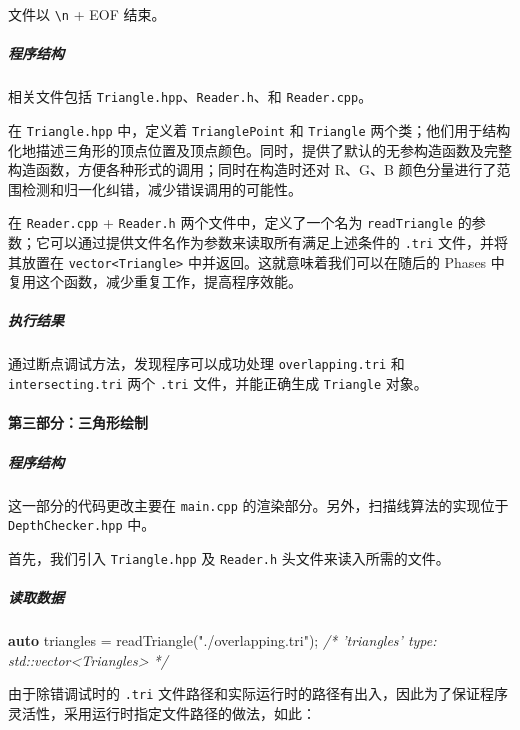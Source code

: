\documentclass[
]{article}
\newenvironment{Shaded}{}{}
\newcommand{\CommentTok}[1]{\textcolor[rgb]{0.38,0.63,0.69}{\textit{#1}}}
\newcommand{\KeywordTok}[1]{\textcolor[rgb]{0.00,0.44,0.13}{\textbf{#1}}}
\newcommand{\NormalTok}[1]{#1}
\newcommand{\StringTok}[1]{\textcolor[rgb]{0.25,0.44,0.63}{#1}}
\begin{document}
文件以 \texttt{\textquotesingle{}\textbackslash{}n\textquotesingle{}} +
EOF 结束。

\hypertarget{header-n28}{%
\subparagraph{程序结构}\label{header-n28}}

相关文件包括 \texttt{Triangle.hpp}、\texttt{Reader.h}、和
\texttt{Reader.cpp}。

在 \texttt{Triangle.hpp} 中，定义着 \texttt{TrianglePoint} 和
\texttt{Triangle}
两个类；他们用于结构化地描述三角形的顶点位置及顶点颜色。同时，提供了默认的无参构造函数及完整构造函数，方便各种形式的调用；同时在构造时还对
R、G、B 颜色分量进行了范围检测和归一化纠错，减少错误调用的可能性。

在 \texttt{Reader.cpp} + \texttt{Reader.h} 两个文件中，定义了一个名为
\texttt{readTriangle}
的参数；它可以通过提供文件名作为参数来读取所有满足上述条件的
\texttt{.tri} 文件，并将其放置在
\texttt{vector\textless{}Triangle\textgreater{}}
中并返回。这就意味着我们可以在随后的 Phases
中复用这个函数，减少重复工作，提高程序效能。

\hypertarget{header-n32}{%
\subparagraph{执行结果}\label{header-n32}}

通过断点调试方法，发现程序可以成功处理 \texttt{overlapping.tri} 和
\texttt{intersecting.tri} 两个 \texttt{.tri} 文件，并能正确生成
\texttt{Triangle} 对象。

\hypertarget{header-n34}{%
\paragraph{第三部分：三角形绘制}\label{header-n34}}

\hypertarget{header-n35}{%
\subparagraph{程序结构}\label{header-n35}}

这一部分的代码更改主要在 \texttt{main.cpp}
的渲染部分。另外，扫描线算法的实现位于 \texttt{DepthChecker.hpp} 中。

首先，我们引入 \texttt{Triangle.hpp} 及 \texttt{Reader.h}
头文件来读入所需的文件。

\hypertarget{header-n38}{%
\subparagraph{读取数据}\label{header-n38}}

\begin{Shaded}
\begin{Highlighting}[]
\KeywordTok{auto}\NormalTok{ triangles = readTriangle(}\StringTok{"./overlapping.tri"}\NormalTok{);}
\CommentTok{/* 'triangles' type: std::vector<Triangles> */}
\end{Highlighting}
\end{Shaded}

由于除错调试时的 \texttt{.tri}
文件路径和实际运行时的路径有出入，因此为了保证程序灵活性，采用运行时指定文件路径的做法，如此：
\end{document}
